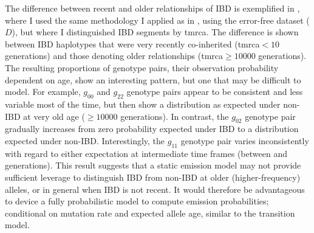 The difference between recent and older relationships of IBD is exemplified in , where I used the same methodology I applied as in , using the error-free dataset ($D$), but where I distinguished IBD segments by \gls{tmrca}.
The difference is shown between IBD haplotypes that were very recently co-inherited (\gls{tmrca}$<10$ generations) and those denoting older relationships (\gls{tmrca}$\geq \num{10000}$ generations).
The resulting proportions of genotype pairs, \ie their observation probability dependent on age,
show an interesting pattern, but one that may be difficult to model.
For example, $g_{0 0}$ and $g_{2 2}$ genotype pairs appear to be consistent and less variable most of the time, but then show a distribution as expected under non-IBD at very old age ($\geq \num{10000}$ generations).
In contrast, the $g_{0 2}$ genotype pair gradually increases from zero probability expected under IBD to a distribution expected under non-IBD.
Interestingly, the $g_{1 1}$ genotype pair varies inconsistently with regard to either expectation at intermediate time frames (\eg between  and  generations).
This result suggests that a static emission model may not provide sufficient leverage to distinguish IBD from non-IBD at older (\ie higher-frequency) alleles, or in general when IBD is not recent.
It would therefore be advantageous to device a fully probabilistic model to compute emission probabilities; \eg conditional on mutation rate and expected allele age, similar to the transition model.








